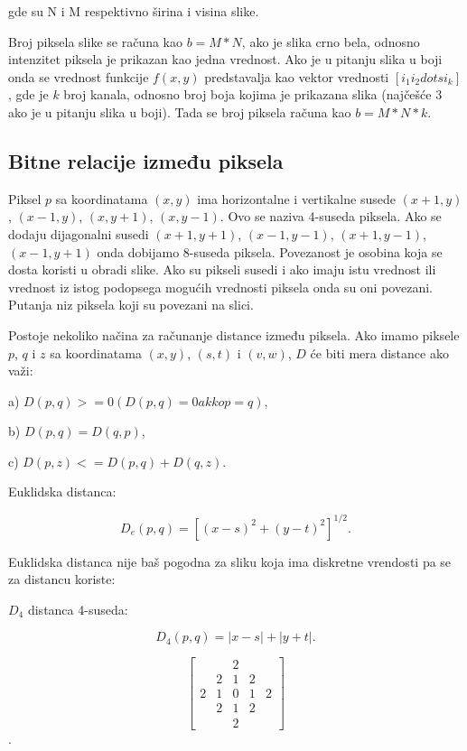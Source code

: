 \documentclass[a4paper,12pt,titlepage]{article}
\begin{document}
gde su N i M respektivno širina i visina slike.

Broj piksela slike se računa kao $b = M * N$, ako je slika crno bela, odnosno intenzitet piksela je prikazan kao jedna vrednost. Ako je u pitanju slika u boji onda se vrednost funkcije $f(x, y)$ predstavalja kao vektor vrednosti $[i_{1} i_{2} dots i_{k}]$, gde je $k$ broj kanala, odnosno broj boja kojima je prikazana slika (najčešće 3 ako je u pitanju slika u boji). Tada se broj piksela računa kao $b = M * N * k$.

\subsection{Bitne relacije između piksela}%

Piksel $p$ sa koordinatama $(x, y)$ ima horizontalne i vertikalne susede $(x + 1, y)$, $(x - 1, y)$, $(x, y + 1)$, $(x, y - 1)$. Ovo se naziva 4-suseda piksela. Ako se dodaju dijagonalni susedi $(x + 1, y + 1)$, $(x - 1, y - 1)$, $(x + 1, y - 1)$, $(x - 1, y + 1)$ onda dobijamo 8-suseda piksela. Povezanost je osobina koja se dosta koristi u obradi slike. Ako su pikseli susedi i ako imaju istu vrednost ili vrednost iz istog podopsega mogućih vrednosti piksela onda su oni povezani. Putanja niz piksela koji su povezani na slici.

Postoje nekoliko načina za računanje distance između piksela. Ako imamo piksele $p$, $q$ i $z$ sa koordinatama $(x, y)$, $(s, t)$ i $(v, w)$, $D$ će biti mera distance ako važi: 

a) $D(p, q) >= 0 (D(p, q) = 0 akko p = q)$,

b) $D(p, q) = D(q, p)$,

c) $D(p, z) <= D(p, q) + D(q, z)$.

Euklidska distanca: 

\begin{equation}\label{eq:euclid}
D_{e}(p, q) = [ (x  - s)^{2} + (y - t)^{2} ]^{1/2}.
\end{equation} 

Euklidska distanca nije baš pogodna za sliku koja ima diskretne vrendosti pa se za distancu koriste:

$D_{4}$ distanca 4-suseda:

\begin{equation}\label{eq:4ne}
D_{4}(p, q) = |x - s| + |y + t|.
\end{equation} 

\[
\begin{bmatrix}
     &  & 2 &   &  \\
     & 2 & 1 & 2  &  \\
     2 & 1 & 0 & 1 & 2 \\
     & 2 & 1 & 2  &  \\
     &  & 2 &   &  
\end{bmatrix}
\].
\end{document}

